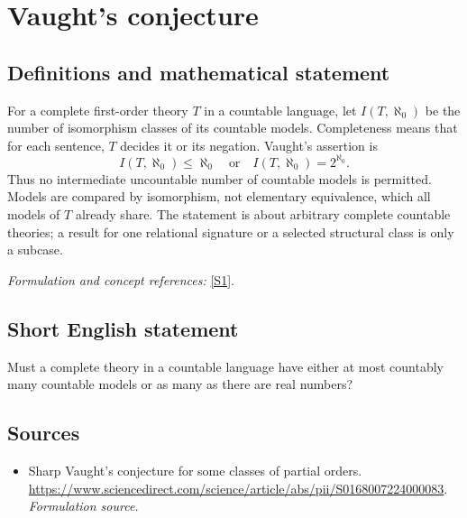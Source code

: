 \documentclass[11pt]{article}
\begin{document}
\section*{\texorpdfstring{Vaught's conjecture}{Vaught's conjecture}}\label{242}
\subsection{Definitions and mathematical statement}
For a complete first-order theory $T$ in a countable language, let $I(T,\aleph_0)$ be the number of isomorphism classes of its countable models. Completeness means that for each sentence, $T$ decides it or its negation. Vaught's assertion is
\[
 I(T,\aleph_0)\le\aleph_0\quad\text{or}\quad I(T,\aleph_0)=2^{\aleph_0}.
\]
Thus no intermediate uncountable number of countable models is permitted. Models are compared by isomorphism, not elementary equivalence, which all models of $T$ already share. The statement is about arbitrary complete countable theories; a result for one relational signature or a selected structural class is only a subcase.
\par\smallskip\textit{Formulation and concept references:} \href{https://www.sciencedirect.com/science/article/abs/pii/S0168007224000083}{[S1]}.

\subsection{Short English statement}
Must a complete theory in a countable language have either at most countably many countable models or as many as there are real numbers?
\subsection{Sources}
\begin{itemize}
\item[S1]Sharp Vaught's conjecture for some classes of partial orders.
\url{https://www.sciencedirect.com/science/article/abs/pii/S0168007224000083}.
\textit{Formulation source.}
\end{itemize}
\end{document}
